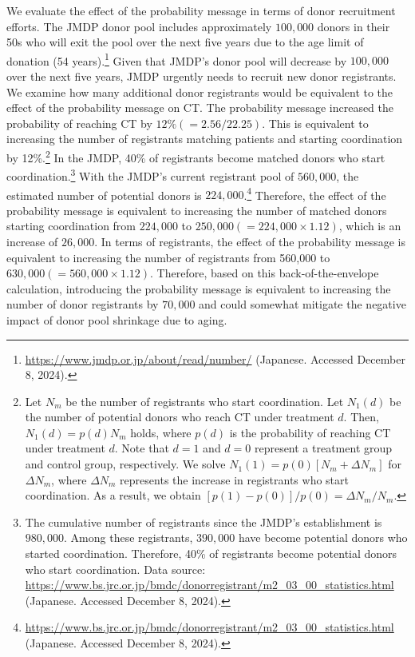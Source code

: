 \documentclass[12pt, a4paper]{article}
\begin{document}
We evaluate the effect of the probability message in terms of donor recruitment efforts. The JMDP donor pool includes approximately \(100,000\) donors in their 50s who will exit the pool over the next five years due to the age limit of donation (54 years).\footnote{\url{https://www.jmdp.or.jp/about/read/number/} (Japanese. Accessed December 8, 2024).} Given that JMDP's donor pool will decrease by \(100,000\) over the next five years, JMDP urgently needs to recruit new donor registrants. We examine how many additional donor registrants would be equivalent to the effect of the probability message on CT. The probability message increased the probability of reaching CT by \(12\% (= 2.56/22.25)\). This is equivalent to increasing the number of registrants matching patients and starting coordination by 12\%.\footnote{Let \(N_m\) be the number of registrants who start coordination. Let \(N_1(d)\) be the number of potential donors who reach CT under treatment \(d\). Then, \(N_1(d) = p(d)N_m\) holds, where \(p(d)\) is the probability of reaching CT under treatment \(d\). Note that \(d = 1\) and \(d = 0\) represent a treatment group and control group, respectively. We solve \(N_1(1) = p(0)[N_m + \Delta N_m]\) for \(\Delta N_m\), where \(\Delta N_m\) represents the increase in registrants who start coordination. As a result, we obtain \([p(1) - p(0)]/p(0) = \Delta N_m/N_m\).} In the JMDP, 40\% of registrants become matched donors who start coordination.\footnote{The cumulative number of registrants since the JMDP's establishment is \(980,000\). Among these registrants, \(390,000\) have become potential donors who started coordination. Therefore, 40\% of registrants become potential donors who start coordination. Data source: \url{https://www.bs.jrc.or.jp/bmdc/donorregistrant/m2_03_00_statistics.html} (Japanese. Accessed December 8, 2024).} With the JMDP's current registrant pool of \(560,000\), the estimated number of potential donors is \(224,000\).\footnote{\url{https://www.bs.jrc.or.jp/bmdc/donorregistrant/m2_03_00_statistics.html} (Japanese. Accessed December 8, 2024).} Therefore, the effect of the probability message is equivalent to increasing the number of matched donors starting coordination from \(224,000\) to \(250,000 (= 224,000 \times 1.12)\), which is an increase of \(26,000\). In terms of registrants, the effect of the probability message is equivalent to increasing the number of registrants from 560,000 to \(630,000 (= 560,000 \times 1.12)\). Therefore, based on this back-of-the-envelope calculation, introducing the probability message is equivalent to increasing the number of donor registrants by \(70,000\) and could somewhat mitigate the negative impact of donor pool shrinkage due to aging.
\end{document}
